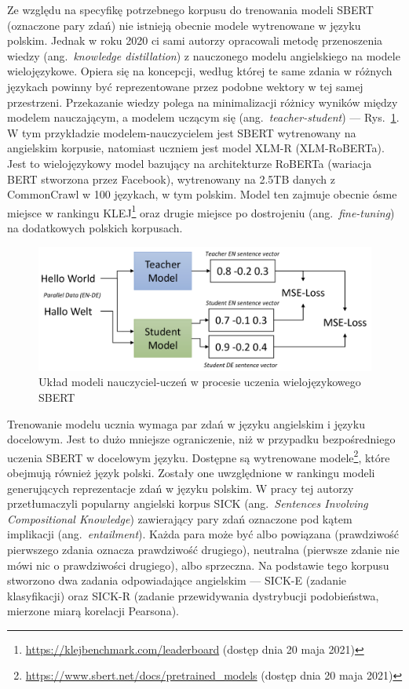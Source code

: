 	Ze względu na specyfikę potrzebnego korpusu do trenowania modeli SBERT (oznaczone pary zdań) nie istnieją obecnie modele wytrenowane w języku polskim.
	Jednak w roku 2020 ci sami autorzy opracowali metodę przenoszenia wiedzy (ang.\ \emph{knowledge distillation}) z nauczonego modelu angielskiego na modele wielojęzykowe\cite{sbert_multilingual}.
	Opiera się na koncepcji, według której te same zdania w różnych językach powinny być reprezentowane przez podobne wektory w tej samej przestrzeni.
	Przekazanie wiedzy polega na minimalizacji różnicy wyników między modelem nauczającym, a modelem uczącym się (ang.\ \emph{teacher-student}) --- Rys.~\ref{fig:sbert_multilingual}.
	W tym przykładzie modelem-nauczycielem jest SBERT wytrenowany na angielskim korpusie, natomiast uczniem jest model XLM-R (XLM-RoBERTa).
	Jest to wielojęzykowy model bazujący na architekturze RoBERTa (wariacja BERT stworzona przez Facebook), wytrenowany na 2.5TB danych z CommonCrawl w 100 językach, w tym polskim\cite{xlm_r}.
	Model ten zajmuje obecnie ósme miejsce w rankingu KLEJ\footnote{\url{https://klejbenchmark.com/leaderboard} (dostęp dnia 20 maja 2021)}
		oraz drugie miejsce po dostrojeniu (ang.\ \emph{fine-tuning}) na dodatkowych polskich korpusach.
	\begin{figure}[htb]
		\centering
		\includegraphics[width=.75\linewidth]{rys03/sbert_multilingual.png}
		\caption[Układ modeli nauczyciel-uczeń w procesie uczenia wielojęzykowego SBERT]{Układ modeli nauczyciel-uczeń w procesie uczenia wielojęzykowego SBERT\cite{sbert_multilingual}}\label{fig:sbert_multilingual}
	\end{figure}
	
	Trenowanie modelu ucznia wymaga par zdań w języku angielskim i języku docelowym.
	Jest to dużo mniejsze ograniczenie, niż w przypadku bezpośredniego uczenia SBERT w docelowym języku.
	Dostępne są wytrenowane modele\footnote{\url{https://www.sbert.net/docs/pretrained_models} (dostęp dnia 20 maja 2021)}, które obejmują również język polski.
	Zostały one uwzględnione w rankingu modeli generujących reprezentacje zdań w języku polskim\cite{sentence_eval}.
	W pracy tej autorzy przetłumaczyli popularny angielski korpus SICK\cite{SICK} (ang.\ \emph{Sentences Involving Compositional Knowledge})
		zawierający pary zdań oznaczone pod kątem implikacji (ang.\ \emph{entailment}).
	Każda para może być albo powiązana (prawdziwość pierwszego zdania oznacza prawdziwość drugiego), neutralna (pierwsze zdanie nie mówi nic o prawdziwości drugiego), albo sprzeczna.
	Na podstawie tego korpusu stworzono dwa zadania odpowiadające angielskim --- SICK-E (zadanie klasyfikacji) oraz SICK-R (zadanie przewidywania dystrybucji podobieństwa, mierzone miarą korelacji Pearsona).
	
